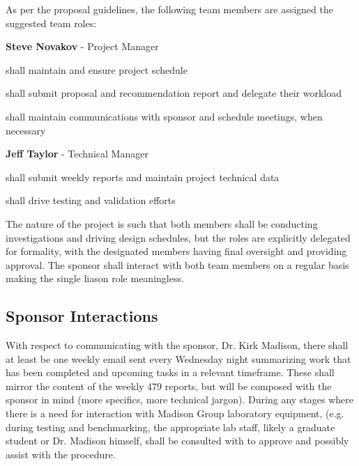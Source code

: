 As per the proposal guidelines, the following team members are assigned the
suggested team roles:
\begin{packed_itemize}
  \item{\textbf{Steve Novakov} - Project Manager}
    \begin{packed_itemize}
      \item shall maintain and ensure project schedule
      \item shall submit proposal and recommendation report and delegate their
      workload
      \item shall maintain communications with sponsor and schedule meetings,
      when necessary
    \end{packed_itemize}
  \item{\textbf{Jeff Taylor} - Technical Manager}
    \begin{packed_itemize}
      \item shall submit weekly reports and maintain project technical data
      \item shall drive testing and validation efforts
    \end{packed_itemize}
\end{packed_itemize}

The nature of the project is such that both members shall be conducting
investigations and driving design schedules, but the roles are explicitly
delegated for formality, with the designated members having final oversight
and providing approval. The sponsor shall interact with both team members on a
regular basis making the single liason role meaningless.

\subsection{Sponsor Interactions}  %

With respect to communicating with the sponsor, Dr. Kirk Madison, there shall
at least be one weekly email sent every Wednesday night summarizing work that has
been completed and upcoming tasks in a relevant timeframe. These shall mirror
the content of the weekly 479 reports, but will be composed with the sponsor in
mind (more specifics, more technical jargon). During any stages where there
is a need for interaction with Madison Group laboratory equipment, (e.g. during
testing and benchmarking, the appropriate lab staff, likely a graduate
student or Dr. Madison himself, shall be consulted with to approve and possibly
assist with the procedure.

